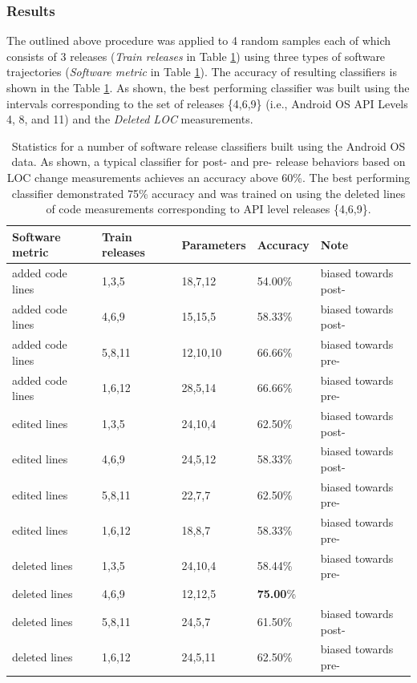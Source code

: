 \subsubsection{Results}
The outlined above procedure was applied to 4 random samples each of which consists of 3 releases (\textit{Train releases} in Table  \ref{android_accuracy}) using three types of software trajectories (\textit{Software metric} in Table \ref{android_accuracy}). The accuracy of resulting classifiers is shown in the Table  \ref{android_accuracy}. As shown, the best performing classifier was built using the intervals corresponding to the set of releases \{4,6,9\} (i.e., Android OS API Levels 4, 8, and 11) and the \textit{Deleted LOC} measurements.

\begin{table}
\begin{tabularx}{\linewidth}{l X X X l}
\toprule
Software metric & Train releases  & Parameters      & Accuracy        & Note\\
\midrule
added code lines &       1,3,5 &  18,7,12& 54.00\% & biased towards post-\\
added code lines &        4,6,9 &  15,15,5 &58.33\% & biased towards post-\\
added code lines &      5,8,11 & 12,10,10 &       66.66\% & biased towards pre-\\
added code lines &       1,6,12 & 28,5,14& 66.66\% & biased towards pre-\\
edited lines &   1,3,5  & 24,10,4& 62.50\%& biased towards post-\\
edited lines &   4,6,9  & 24,5,12& 58.33\% & biased towards post-\\
edited lines &   5,8,11&  22,7,7 & 62.50\%  &biased towards pre-\\
edited lines &   1,6,12 & 18,8,7 & 58.33\% & biased towards pre-\\
deleted lines &  1,3,5  & 24,10,4& 58.44\% & biased towards pre-\\
deleted lines &  4,6,9  & 12,12,5 &\textbf{75.00}\%  & \\
deleted lines &  5,8,11&  24,5,7 & 61.50\% & biased towards post-\\
deleted lines &  1,6,12 & 24,5,11 &62.50\% & biased towards pre-\\
\bottomrule
\end{tabularx}
\caption[Accuracy of the LOOCV evaluation for Android OS pre- and post- release behaviors classifiers.]{Statistics for a number of software release classifiers built using the Android OS data. As shown, a typical classifier for post- and pre- release behaviors based on LOC change measurements achieves an accuracy above 60\%. The best performing classifier demonstrated 75\% accuracy and was trained on using the deleted lines of code measurements corresponding to API level releases \{4,6,9\}.}
\label{android_accuracy}
\end{table}


